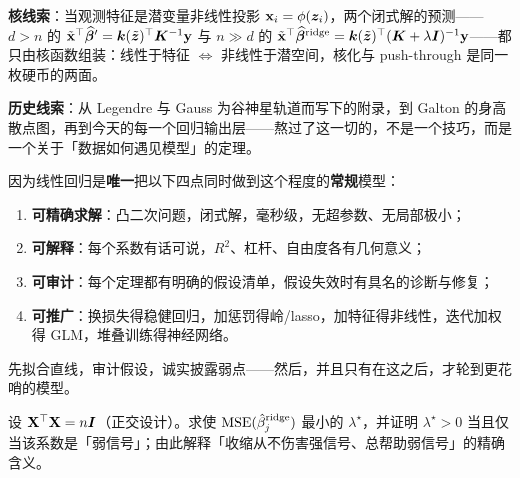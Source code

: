\textbf{核线索}：当观测特征是潜变量非线性投影 $\mathbf{x}_i = \phi(\bm{z}_i)$，两个闭式解的预测——$d > n$ 的 $\tilde{\mathbf{x}}^\top\widehat{\bm{\beta}}' = \bm{k}(\tilde{\bm{z}})^\top \bm{K}^{-1}\mathbf{y}$ 与 $n \gg d$ 的 $\tilde{\mathbf{x}}^\top\widehat{\bm{\beta}}^{\mathrm{ridge}} = \bm{k}(\tilde{\bm{z}})^\top(\bm{K} + \lambda\bm{I})^{-1}\mathbf{y}$——都只由核函数组装：线性于特征 $\Leftrightarrow$ 非线性于潜空间，核化与 push-through 是同一枚硬币的两面\cite{scholkopf2002,kimeldorf1970,rahimi2007}。

\textbf{历史线索}：从 Legendre 与 Gauss 为谷神星轨道而写下的附录\cite{legendre1805,gauss1809}，到 Galton 的身高散点图\cite{galton1886}，再到今天的每一个回归输出层——熬过了这一切的，不是一个技巧，而是一个关于「数据如何遇见模型」的定理。

\begin{keybox}[最终答案]
因为线性回归是\textbf{唯一}把以下四点同时做到这个程度的\textbf{常规}模型：
\begin{enumerate}[label=(\roman*)]
  \item \textbf{可精确求解}：凸二次问题，闭式解，毫秒级，无超参数、无局部极小；
  \item \textbf{可解释}：每个系数有话可说，$R^2$、杠杆、自由度各有几何意义；
  \item \textbf{可审计}：每个定理都有明确的假设清单，假设失效时有具名的诊断与修复；
  \item \textbf{可推广}：换损失得稳健回归，加惩罚得岭/lasso，加特征得非线性，迭代加权得 GLM，堆叠训练得神经网络。
\end{enumerate}
先拟合直线，审计假设，诚实披露弱点——然后，并且只有在这之后，才轮到更花哨的模型。
\end{keybox}

\begin{exercise}\label{ex:orth-ridge}
设 $\mathbf{X}^\top\mathbf{X} = n\bm{I}$（正交设计）。求使 $\mathrm{MSE}(\hat\beta_j^{\mathrm{ridge}})$ 最小的 $\lambda^\star$，并证明 $\lambda^\star > 0$ 当且仅当该系数是「弱信号」；由此解释「收缩从不伤害强信号、总帮助弱信号」的精确含义。
\end{exercise}
